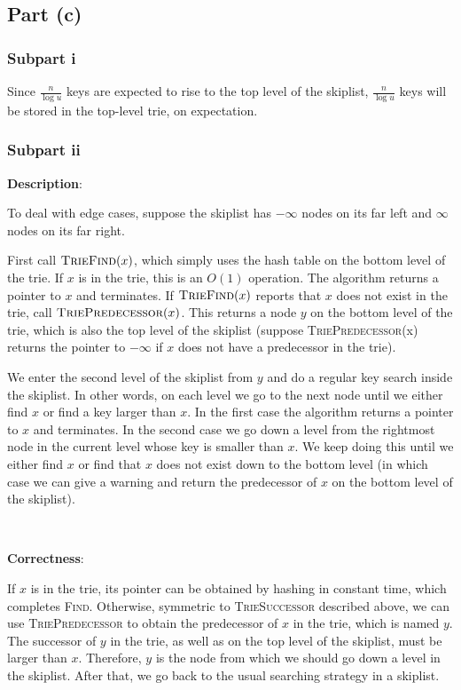 \documentclass{article}
\begin{document}
\subsection{Part (c)}
\subsubsection{Subpart i}
Since $\frac{n}{\log u}$ keys are expected to rise to the top level of the skiplist, $\frac{n}{\log u}$ keys will be stored in the top-level trie, on expectation.

\subsubsection{Subpart ii}
\noindent\textbf{Description}:

To deal with edge cases, suppose the skiplist has $-\infty$ nodes on its far left and $\infty$ nodes on its far right.

First call $\textsc{TrieFind}(x)$, which simply uses the hash table on the bottom level of the trie. If $x$ is in the trie, this is an $O(1)$ operation. The algorithm returns a pointer to $x$ and terminates. If $\textsc{TrieFind}(x)$ reports that $x$ does not exist in the trie, call $\textsc{TriePredecessor}(x)$. This returns a node $y$ on the bottom level of the trie, which is also the top level of the skiplist (suppose \textsc{TriePredecessor}(x) returns the pointer to $-\infty$ if $x$ does not have a predecessor in the trie).

We enter the second level of the skiplist from $y$ and do a regular key search inside the skiplist. In other words, on each level we go to the next node until we either find $x$ or find a key larger than $x$. In the first case the algorithm returns a pointer to $x$ and terminates. In the second case we go down a level from the rightmost node in the current level whose key is smaller than $x$. We keep doing this until we either find $x$ or find that $x$ does not exist down to the bottom level (in which case we can give a warning and return the predecessor of $x$ on the bottom level of the skiplist).

~

\noindent\textbf{Correctness}:


If $x$ is in the trie, its pointer can be obtained by hashing in constant time, which completes \textsc{Find}. Otherwise, symmetric to \textsc{TrieSuccessor} described above, we can use \textsc{TriePredecessor} to obtain the predecessor of $x$ in the trie, which is named $y$. The successor of $y$ in the trie, as well as on the top level of the skiplist, must be larger than $x$. Therefore, $y$ is the node from which we should go down a level in the skiplist. After that, we go back to the usual searching strategy in a skiplist.
\end{document}
